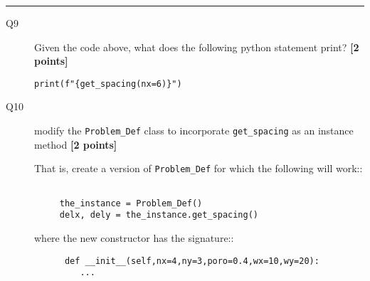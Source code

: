 \documentclass{article}
\begin{document}
\rule{15cm}{0.75pt}

\begin{description}

\item[Q9] Given the code above, what does the following python statement print?
  \textbf{[2 points]}
  
\verb+print(f"{get_spacing(nx=6)}")+

\vspace{1.5cm}
  
\end{description}


\begin{description}  

  
\item[Q10] modify the \verb+Problem_Def+ class to
  incorporate \verb+get_spacing+ as an instance method \textbf{[2 points]}

  That is, create a version of \verb+Problem_Def+ for which the following will work::

\begin{verbatim}

     the_instance = Problem_Def()
     delx, dely = the_instance.get_spacing()

\end{verbatim}

where the new constructor has the signature::

\begin{verbatim}
      def __init__(self,nx=4,ny=3,poro=0.4,wx=10,wy=20):
         ...
\end{verbatim}

  
\end{description}  
\end{document}

